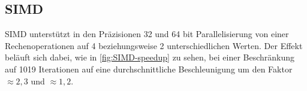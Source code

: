 \subsection{SIMD}




SIMD unterstützt in den Präzisionen 32 und 64 bit Parallelisierung von einer Rechenoperationen auf
4 beziehungsweise 2 unterschiedlichen Werten. Der Effekt beläuft sich dabei, wie in \autoref{fig:SIMD-speedup} zu sehen,
bei einer Beschränkung auf 1019 Iterationen auf eine durchschnittliche Beschleunigung um den Faktor $\approx2,3$ und $\approx1,2$.

